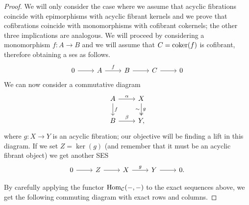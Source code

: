 \begin{proof}
	We will only consider the case where we assume that acyclic fibrations coincide with epimorphisms with acyclic fibrant kernels and we prove that cofibrations
	coincide with monomorphisms with cofibrant cokernels; the other three implications are analogous.
	We will proceed by considering a monomorphism $f\colon A \longrightarrow B$ and we will assume that $C = \operatorname{coker}(f)$ is cofibrant, therefore obtaining a ses as follows.
	\[\begin{tikzcd}
		0 & A & B & C & 0
		\arrow[from=1-1, to=1-2]
		\arrow["f", from=1-2, to=1-3]
		\arrow[from=1-3, to=1-4]
		\arrow[from=1-4, to=1-5]
	\end{tikzcd}\]
	We can now consider a commutative diagram
	\[\begin{tikzcd}
		A & X \\
		B & {Y,}
		\arrow["\alpha", from=1-1, to=1-2]
		\arrow["f", from=1-1, to=2-1]
		\arrow["g", "\sim"', two heads, from=1-2, to=2-2]
		\arrow["\beta", from=2-1, to=2-2]
	\end{tikzcd}\]
	where $g\colon X \longrightarrow Y$ is an acyclic fibration; our objective will be finding a lift in this diagram. If we set $Z = \ker(g)$ (and remember that it must be an acyclic fibrant object) we get another SES
	\[\begin{tikzcd}
		0 & Z & X & Y & {0.}
		\arrow[from=1-1, to=1-2]
		\arrow[from=1-2, to=1-3]
		\arrow["g", from=1-3, to=1-4]
		\arrow[from=1-4, to=1-5]
	\end{tikzcd}\]

	By carefully applying the functor $\mathrm{Hom}_{\mathcal{C}}({-},{-})$ to the exact sequences above, we get the following commuting diagram with exact rows and columns.


\end{proof}
